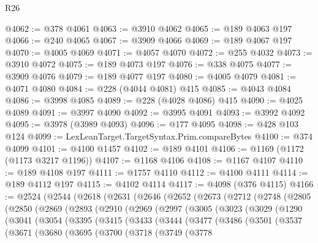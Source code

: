 \begin{lexlean}{R26}
\begin{coremodule}
@4062 := @378 @4061
@4063 := @3910 @4062
@4065 := @189 @4063 @197
@4066 := @240 @4065
@4067 := @3909 @4066
@4069 := @189 @4067 @197
@4070 := @4005 @4069
@4071 := @4057 @4070
@4072 := @255 @4032
@4073 := @3910 @4072
@4075 := @189 @4073 @197
@4076 := @338 @4075
@4077 := @3909 @4076
@4079 := @189 @4077 @197
@4080 := @4005 @4079
@4081 := @4071 @4080
@4084 := @228 (@4044 @4081) @415
@4085 := @4043 @4084
@4086 := @3998 @4085
@4089 := @228 (@4028 @4086) @415
@4090 := @4025 @4089
@4091 := @3997 @4090
@4092 := @3995 @4091
@4093 := @3992 @4092
@4095 := @3978 (@3989 @4093)
@4096 := @177 @4095
@4098 := @428 @103 @124
@4099 := LexLeanTarget.TargetSyntax.Prim.compareBytes
@4100 := @374 @4099
@4101 := @4100 @1457
@4102 := @189 @4101
@4106 := @1169 (@1172 (@1173 @3217 @1196))
@4107 := @1168 @4106
@4108 := @1167 @4107
@4110 := @189 @4108 @197
@4111 := @1757 @4110
@4112 := @4100 @4111
@4114 := @189 @4112 @197
@4115 := @4102 @4114
@4117 := @4098 (@376 @4115)
@4166 := @2524
    (@2544
      (@2618
        (@2631
          (@2646
            (@2652
              (@2673
                (@2712
                  (@2748
                    (@2805
                      (@2850
                        (@2869
                          (@2893
                            (@2910
                              (@2969
                                (@2997
                                  (@3005
                                    (@3023
                                      (@3029
                                        (@1290
                                          (@3041
                                            (@3054
                                              (@3395
                                                (@3415
                                                  (@3433
                                                    (@3444
                                                      (@3477
                                                        (@3486
                                                          (@3501
                                                            (@3537
                                                              (@3671
                                                                (@3680
                                                                  (@3695
                                                                    (@3700
                                                                      (@3718
                                                                        (@3749
                                                                          (@3778

\end{coremodule}
\end{lexlean}
